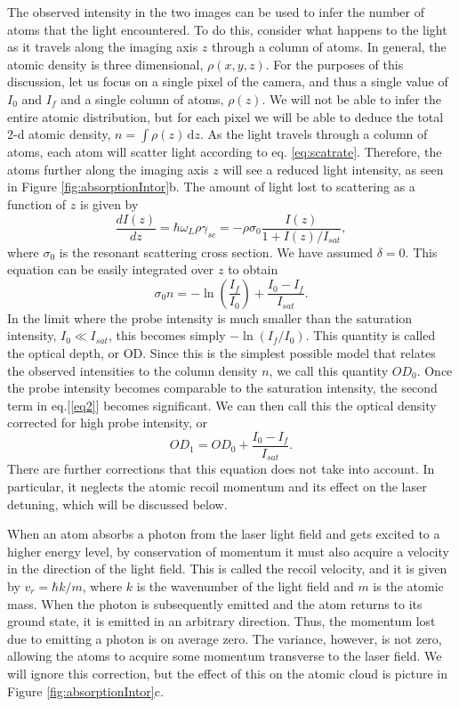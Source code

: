 \documentclass[12pt]{iopart}
\begin{document}
\par The observed intensity in the two images can be used to infer the number of atoms that the light encountered. To do this, consider what happens to the light as it travels along the imaging axis $z$ through a column of atoms. In general, the atomic density is three dimensional, $\rho(x,y,z)$. For the purposes of this discussion, let us focus on a single pixel of the camera, and thus a single value of $I_0$ and $I_f$ and a single column of atoms, $\rho(z)$. We will not be able to infer the entire atomic distribution, but for each pixel we will be able to deduce the total 2-d atomic density, $n = \int \rho\left(z\right) \,\mathrm{d}z$. As the light travels through a column of atoms, each atom will scatter light according to eq. \ref{eq:scatrate}. Therefore, the atoms further along the imaging axis $z$ will see a reduced light intensity, as seen in Figure \ref{fig:absorptionIntor}b. The amount of light lost to scattering as a function of $z$ is given by
\begin{equation}
\frac{dI(z)}{dz}=\hbar\omega_L\rho\gamma_{sc}=-\rho\sigma_0\frac{I(z)}{1+I(z)/I_{sat}},
\end{equation}
where $\sigma_0$ is the resonant scattering cross section. We have assumed $\delta=0$. 
 This equation can be easily integrated over $z$ to obtain  \cite{Reinaudi07}
\begin{equation} 
\sigma_0 n = -\ln\left(\frac{I_f}{I_0}\right) + \frac{I_0-I_f}{I_{sat}}.
\label{eq2}
\end{equation}
In the limit where the probe intensity is much smaller than the saturation intensity, $I_0\ll I_{sat}$, this becomes simply $-\ln \left(I_f/I_0\right)$. This quantity is called the optical depth, or OD. Since this is the simplest possible model that relates the observed intensities to the column density $n$, we call this quantity $OD_0$. Once the probe intensity becomes comparable to the saturation intensity, the second term in eq.[\ref{eq2}] becomes significant. We can then call this the optical density corrected for high probe intensity, or
\begin{equation} 
OD_1 = OD_0 + \frac{I_0-I_f}{I_{sat}}.
\label{eq:OD1}
\end{equation}
There are further corrections that this equation does not take into account. In particular, it neglects the atomic recoil momentum and its effect on the laser detuning, which will be discussed below.
\par When an atom absorbs a photon from the laser light field and gets excited to a higher energy level, by conservation of momentum it must also acquire a velocity in the direction of the light field. This is called the recoil velocity, and it is given by $v_r=\hbar k/m$, where $k$ is the wavenumber of the light field and $m$ is the atomic mass. When the photon is subsequently emitted and the atom returns to its ground state, it is emitted in an arbitrary direction. Thus, the momentum lost due to emitting a photon is on average zero. The variance, however, is not zero, allowing the atoms to acquire some momentum transverse to the laser field. We will ignore this correction, but the effect of this on the atomic cloud is picture in Figure \ref{fig:absorptionIntor}c. 
\end{document}
